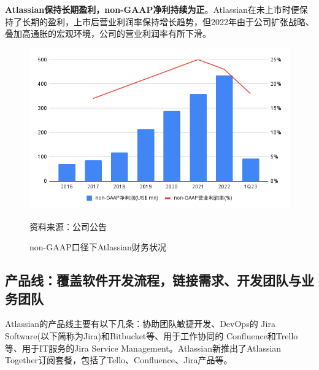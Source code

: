 \textbf{Atlassian保持长期盈利，non-GAAP净利持续为正}。Atlassian在未上市时便保持了长期的盈利，上市后营业利润率保持增长趋势，但2022年由于公司扩张战略、叠加高通胀的宏观环境，公司的营业利润率有所下滑。
\begin{figure}[H]
    \caption{non-GAAP口径下Atlassian财务状况}
    \begin{center}
        \includegraphics[width=\linewidth]{img/non-GAAP.png}
    \end{center}
    \footnotesize{资料来源：公司公告}
\end{figure}

\subsection{产品线：覆盖软件开发流程，链接需求、开发团队与业务团队}
Atlassian的产品线主要有以下几条：协助团队敏捷开发、DevOps的 Jira Software(以下简称为Jira)和Bitbucket等、用于工作协同的 Confluence和Trello等、用于IT服务的Jira Service Management。Atlassian新推出了Atlassian Together订阅套餐，包括了Tello、Confluence、Jira产品等。

